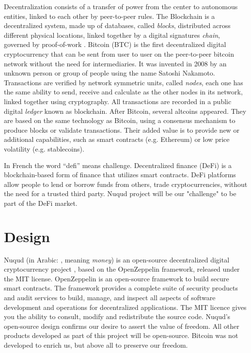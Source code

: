 \documentclass[12pt]{article}
\begin{document}
Decentralization consists of a transfer of power from the center to autonomous entities, linked to each other by peer-to-peer rules. The Blockchain is a decentralized system, made up of databases, called \emph{blocks}, distributed across different physical locations, linked together by a digital signatures \emph{chain}, governed by proof-of-work \cite{nakamoto2008bitcoin}. Bitcoin (BTC) is the first decentralized digital cryptocurrency that can be sent from user to user on the peer-to-peer bitcoin network without the need for intermediaries. It was invented in 2008 by an unknown person or group of people using the name Satoshi Nakamoto. Transactions are verified by network symmetric units, called \emph{nodes}, each one has the same ability to send, receive and calculate as the other nodes in its network, linked together using cryptography. All transactions are recorded in a public digital \emph{ledger} known as blockchain. After Bitcoin, several altcoins appeared. They are based on the same technology as Bitcoin, using a consensus mechanism to produce blocks or validate transactions. Their added value is to provide new or additional capabilities, such as smart contracts (e.g. Ethereum) or low price volatility (e.g. stablecoins).

In French the word “defi” means challenge. Decentralized finance (DeFi) is a blockchain-based form of finance that utilizes smart contracts. DeFi platforms allow people to lend or borrow funds from others, trade cryptocurrencies, without the need for a trusted third party. Nuqud project will be our "challenge" to be part of the DeFi market.

\section{Design}

Nuqud (in Arabic: \foreignlanguage{arabic}{}, meaning \emph{money}) is an open-source decentralized digital cryptocurrency project \cite{nuqud2021repository}, based on the OpenZeppelin framework, released under the MIT license. OpenZeppelin is an open-source framework to build secure smart contracts. The framework provides a complete suite of security products and audit services to build, manage, and inspect all aspects of software development and operations for decentralized applications. The MIT licence gives you the ability to consult, modify and redistribute the source code. Nuqud's open-source design confirms our desire to assert the value of freedom. All other products developed as part of this project will be open-source. Bitcoin was not developed to enrich us, but above all to preserve our freedom.
\end{document}

